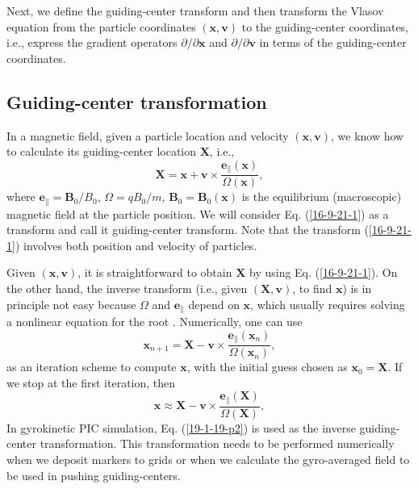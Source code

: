 \documentclass{article}
\newcommand{\tmmathbf}[1]{\ensuremath{\boldsymbol{#1}}}
\begin{document}
Next, we define the guiding-center transform and then transform the Vlasov
equation from the particle coordinates $(\mathbf{x}, \mathbf{v})$ to the
guiding-center coordinates, i.e., express the gradient operators $\partial /
\partial \mathbf{x}$ and $\partial / \partial \mathbf{v}$ in terms of the
guiding-center coordinates.

\subsection{Guiding-center transformation}

In a magnetic field, given a particle location and velocity $(\mathbf{x},
\mathbf{v})$, we know how to calculate its guiding-center location
$\mathbf{X}$, i.e.,
\begin{equation}
  \label{16-9-21-1} \mathbf{X}=\mathbf{x}+\mathbf{v} \times
  \frac{\tmmathbf{e}_{\parallel} (\mathbf{x})}{\Omega (\mathbf{x})},
\end{equation}
where $\tmmathbf{e}_{\parallel} =\mathbf{B}_0 / B_0$, $\Omega = q B_0 / m$,
$\mathbf{B}_0 =\mathbf{B}_0 (\mathbf{x})$ is the equilibrium (macroscopic)
magnetic field at the particle position. We will consider Eq.
(\ref{16-9-21-1}) as a transform and call it guiding-center
transform{\cite{Catto1978}}. Note that the transform (\ref{16-9-21-1})
involves both position and velocity of particles.

Given $(\mathbf{x}, \mathbf{v})$, it is straightforward to obtain $\mathbf{X}$
by using Eq. (\ref{16-9-21-1}). On the other hand, the inverse transform
(i.e., given $(\mathbf{X}, \mathbf{v})$, to find $\mathbf{x}$) is in principle
not easy because $\Omega$ and $\mathbf{e}_{\parallel}$ depend on $\mathbf{x}$,
which usually requires solving a nonlinear equation for the root .
Numerically, one can use
\begin{equation}
  \label{18-9-13-p1} \mathbf{x}_{n + 1} =\mathbf{X}-\mathbf{v} \times
  \frac{\tmmathbf{e}_{\parallel} (\mathbf{x}_n)}{\Omega (\mathbf{x}_n)},
\end{equation}
as an iteration scheme to compute $\mathbf{x}$, with the initial guess chosen
as $\mathbf{x}_0 =\mathbf{X}$. If we stop at the first iteration, then
\begin{equation}
  \label{19-1-19-p2} \mathbf{x} \approx \mathbf{X}-\mathbf{v} \times
  \frac{\tmmathbf{e}_{\parallel} (\mathbf{X})}{\Omega (\mathbf{X})},
\end{equation}
In gyrokinetic PIC simulation, Eq. (\ref{19-1-19-p2}) is used as the inverse
guiding-center transformation. This transformation needs to be performed
numerically when we deposit markers to grids or when we calculate the
gyro-averaged field to be used in pushing guiding-centers.
\end{document}
